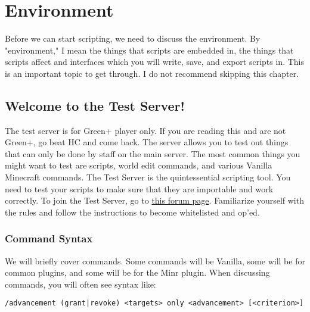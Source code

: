 \documentclass[oneside]{book}
\begin{document}
\hypersetup{linkcolor=black}
\tableofcontents
\hypersetup{linkcolor=blue}

\mainmatter
\pagestyle{plain}

\chapter{Environment}
Before we can start scripting, we need to discuss the environment. By "environment," I mean the things that scripts are embedded in, the things that scripts affect and interfaces which you will write, save, and export scripts in. This is an important topic to get through. I do not recommend skipping this chapter.

\section{Welcome to the Test Server!}
The test server is for Green+ player only. If you are reading this and are not Green+, go beat HC and come back. The server allows you to test out things that can only be done by staff on the main server. The most common things you might want to test are scripts, world edit commands, and various Vanilla Minecraft commands. The Test Server is the quintessential scripting tool. You need to test your scripts to make sure that they are importable and work correctly. To join the Test Server, go to \href{https://forums.minr.org/pages/testserver/}{this forum page}. Familiarize yourself with the rules and follow the instructions to become whitelisted and op'ed.

\subsection{Command Syntax}

We will briefly cover commands. Some commands will be Vanilla, some will be for common plugins, and some will be for the Minr plugin. When discussing commands, you will often see syntax like:

\begin{verbatim}
/advancement (grant|revoke) <targets> only <advancement> [<criterion>]
\end{verbatim}
\end{document}
